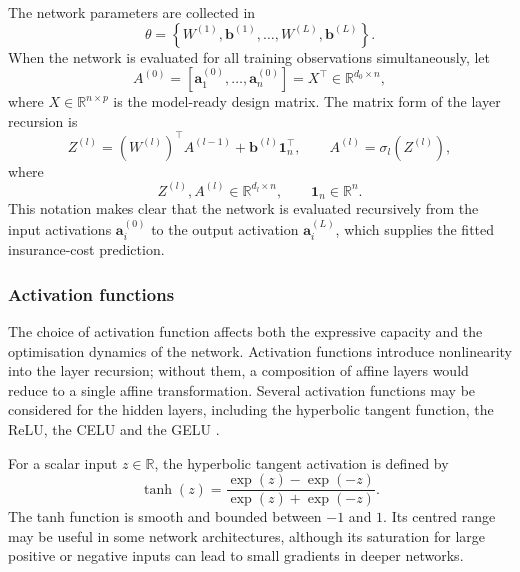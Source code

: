 \noindent
The network parameters are collected in
\begin{equation}
\label{eq:parameter_vector}
    \theta
    =
    \left\{
        W^{(1)},\mathbf{b}^{(1)},\ldots,
        W^{(L)},\mathbf{b}^{(L)}
    \right\}.
\end{equation}
When the network is evaluated for all training observations simultaneously, let
\[
    A^{(0)}
    =
    \left[
        \mathbf{a}^{(0)}_1,
        \ldots,
        \mathbf{a}^{(0)}_n
    \right]
    =
    X^{\top}
    \in
    \mathbb{R}^{d_0\times n},
\]
where \(X\in\mathbb{R}^{n\times p}\) is the model-ready design matrix. The
matrix form of the layer recursion is
\begin{equation}
\label{eq:matrix_layer_recursion}
    Z^{(l)}
    =
    \left(W^{(l)}\right)^{\top}
    A^{(l-1)}
    +
    \mathbf{b}^{(l)}\mathbf{1}_{n}^{\top},
    \qquad
    A^{(l)}
    =
    \sigma_l
    \!\left(
        Z^{(l)}
    \right),
\end{equation}
where
\[
    Z^{(l)}, A^{(l)}
    \in
    \mathbb{R}^{d_l\times n},
    \qquad
    \mathbf{1}_{n}
    \in
    \mathbb{R}^{n}.
\]
This notation makes clear that the network is evaluated recursively from the
input activations \(\mathbf{a}^{(0)}_i\) to the output activation
\(\mathbf{a}^{(L)}_i\), which supplies the fitted insurance-cost prediction.

\subsubsection{Activation functions}
\label{sec:activation_functions}

\noindent
The choice of activation function affects both the expressive capacity and the
optimisation dynamics of the network. Activation functions introduce
nonlinearity into the layer recursion; without them, a composition of affine
layers would reduce to a single affine transformation. Several activation
functions may be considered for the hidden layers, including the hyperbolic
tangent function, the ReLU, the CELU and the GELU
\citep{goodfellow2016deep,lee2023gelu}.

\noindent
For a scalar input \(z\in\mathbb{R}\), the hyperbolic tangent activation is
defined by
\begin{equation}
\label{eq:tanh}
    \tanh(z)
    =
    \frac{\exp(z)-\exp(-z)}
         {\exp(z)+\exp(-z)}.
\end{equation}
The tanh function is smooth and bounded between \(-1\) and \(1\). Its centred
range may be useful in some network architectures, although its saturation for
large positive or negative inputs can lead to small gradients in deeper
networks.

